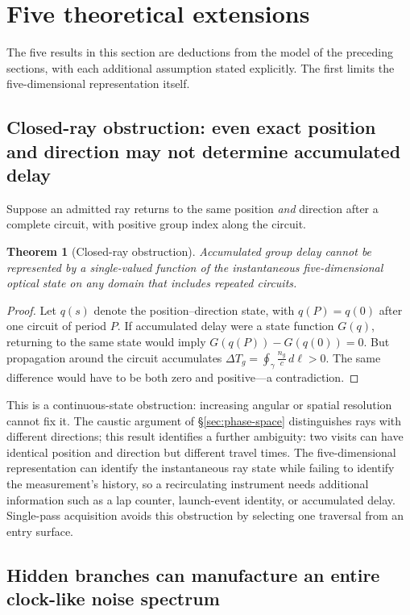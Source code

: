 \documentclass[11pt]{article}
\newtheorem{theorem}{Theorem}
\begin{document}
\section{Five theoretical extensions}\label{sec:extensions}

The five results in this section are deductions from the model of the preceding
sections, with each additional assumption stated explicitly. The first limits the
five-dimensional representation itself.

\subsection{Closed-ray obstruction: even exact position and direction may not determine accumulated delay}

Suppose an admitted ray returns to the same position \emph{and} direction after a
complete circuit, with positive group index along the circuit.

\begin{theorem}[Closed-ray obstruction]\label{thm:closedray}
Accumulated group delay cannot be represented by a single-valued function of the
instantaneous five-dimensional optical state on any domain that includes repeated
circuits.
\end{theorem}
\begin{proof}
Let $q(s)$ denote the position--direction state, with $q(P) = q(0)$ after one circuit of
period $P$. If accumulated delay were a state function $G(q)$, returning to the same
state would imply $G(q(P)) - G(q(0)) = 0$. But propagation around the circuit accumulates
$\Delta T_g = \oint_\gamma \frac{n_g}{c}\,d\ell > 0$. The same difference would have to
be both zero and positive---a contradiction.
\end{proof}

This is a continuous-state obstruction: increasing angular or spatial resolution cannot
fix it. The caustic argument of \S\ref{sec:phase-space} distinguishes rays with
different directions; this result identifies a further ambiguity: two visits can have
identical position and direction but different travel times. The five-dimensional
representation can identify the instantaneous ray state while failing to identify the
measurement's history, so a recirculating instrument needs additional information such
as a lap counter, launch-event identity, or accumulated delay. Single-pass acquisition
avoids this obstruction by selecting one traversal from an entry surface.

\subsection{Hidden branches can manufacture an entire clock-like noise spectrum}
\end{document}
